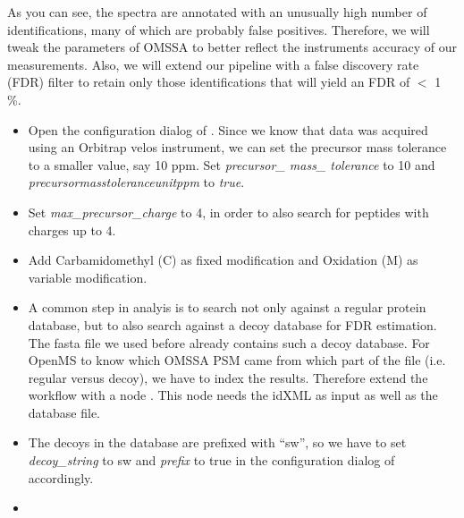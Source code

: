 As you can see, the spectra are annotated with an unusually high number of identifications, many of which are probably false positives. Therefore, we will tweak the parameters of OMSSA to better reflect the instruments accuracy of our measurements. Also, we will extend our pipeline with a false discovery rate (FDR) filter to retain only those identifications that will yield an FDR of $<$ 1 \%.

\begin{itemize}
\item
Open the configuration dialog of .
Since we know that data was acquired using an Orbitrap velos instrument, we can set the precursor mass tolerance to a smaller value, say 10 ppm.
Set \textit{precursor\_ mass\_ tolerance} to 10 and \\ \textit{precursor\textunderscore mass\textunderscore tolerance\textunderscore unit\textunderscore ppm} to \textit{true}.
\item
Set \textit{max\_precursor\_charge} to 4, in order to also search for peptides with charges up to 4.
\item
Add Carbamidomethyl (C) as fixed modification and Oxidation (M) as variable modification.
\item
A common step in analyis is to search not only against a regular protein database, but to also search against a decoy database for FDR estimation.
The fasta file we used before already contains such a decoy database.
For OpenMS to know which OMSSA PSM came from which part of the file (i.e. regular versus decoy), we have to index the results.
Therefore extend the workflow with a  node .
This node needs the idXML as input as well as the database file.
\item
The decoys in the database are prefixed with ``sw'', so we have to set \textit{decoy\_string} to sw and \textit{prefix} to true in the configuration dialog of  accordingly.
\item

\end{itemize}
